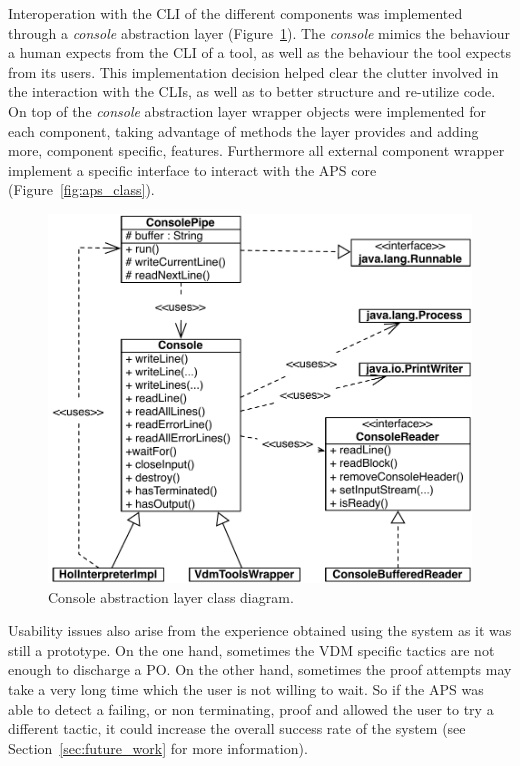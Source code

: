 \documentclass[]{article}
\begin{document}
Interoperation with the CLI of the different components was implemented through a \emph{console} abstraction layer (Figure~\ref{fig:aps_console_class}).
The \emph{console} mimics the behaviour a human expects from the CLI of a tool, as well as the behaviour the tool expects from its users.
This implementation decision helped clear the clutter involved in the interaction with the CLIs, as well as to better structure and re-utilize code.
On top of the \emph{console} abstraction layer wrapper objects were implemented for each component, taking advantage of methods the layer provides and adding more, component specific, features.
Furthermore all external component wrapper implement a specific interface to interact with the APS core (Figure~\ref{fig:aps_class}).

\begin{figure}
  \begin{center}
    \includegraphics[width=.8\textwidth]{images/aps_console_class_diagram.pdf}
    \caption[Console asbtraction class diagram]{Console abstraction layer class diagram.}
    \label{fig:aps_console_class}
  \end{center}
\end{figure}

Usability issues also arise from the experience obtained using the system as it was still a prototype.
On the one hand, sometimes the VDM specific tactics are not enough to discharge a PO.
On the other hand, sometimes the proof attempts may take a very long time which the user is not willing to wait.
So if the APS was able to detect a failing, or non terminating, proof and allowed the user to try a different tactic, it could increase the overall success rate of the system (see Section~\ref{sec:future_work} for more information).
\end{document}
